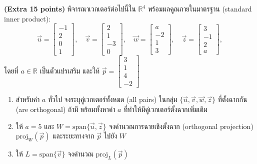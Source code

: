 ﻿\documentclass[12pt, a4paper]{exam}
\begin{document}
\begin{questions}
\question \textbf{(Extra 15 points)} พิจารณาเวกเตอร์ต่อไปนี้ใน $\mathbb{R}^4$ พร้อมผลคูณภายในมาตรฐาน (standard inner product):
\[
\vec{u} = \begin{bmatrix} -1 \\ 2 \\ 0 \\ 1 \end{bmatrix}, \quad
\vec{v} = \begin{bmatrix} 2 \\ 1 \\ -3 \\ 0 \end{bmatrix}, \quad
\vec{w} = \begin{bmatrix} a \\ -2 \\ 1 \\ 3 \end{bmatrix}, \quad
\vec{z} = \begin{bmatrix} 3 \\ -1 \\ 2 \\ a \end{bmatrix},
\]
โดยที่ $a \in \mathbb{R}$ เป็นตัวแปรเสริม และให้ $\vec{p} = \begin{bmatrix} 3 \\ 1 \\ 4 \\ -2 \end{bmatrix}$
\begin{enumerate}[label=(\alph*)]
    \item สำหรับค่า $a$ ทั่วไป จงระบุคู่เวกเตอร์ทั้งหมด (all pairs) ในกลุ่ม $\{\vec{u}, \vec{v}, \vec{w}, \vec{z}\}$ ที่ตั้งฉากกัน (are orthogonal) ถ้ามี พร้อมทั้งหาค่า $a$ ที่ทำให้มีคู่เวกเตอร์ตั้งฉากเพิ่มเติม
    \item ให้ $a = 5$ และ $W = \text{span}\{\vec{u}, \vec{z}\}$ จงคำนวณการฉายเชิงตั้งฉาก (orthogonal projection) $\text{proj}_W(\vec{p})$ และระยะทางจาก $\vec{p}$ ไปยัง $W$
    \item ให้ $L = \text{span}\{\vec{v}\}$ จงคำนวณ $\text{proj}_L(\vec{p})$
\end{enumerate}

\end{questions}
\end{document}
